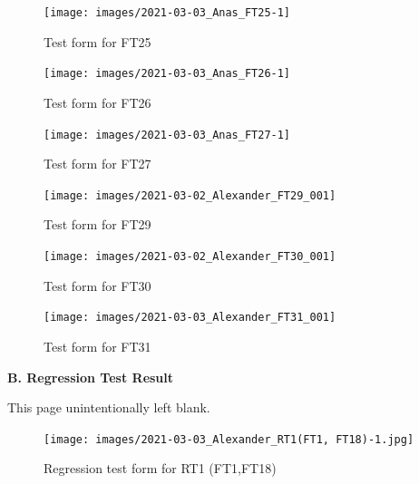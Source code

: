 \documentclass{article}
\begin{document}
 \begin{figure}
     \centering
     \texttt{[image: images/2021-03-03\_Anas\_FT25-1]}
     \renewcommand\figurename{Figure}
     \caption{Test form for FT25}
     \label{fig:my_label}
 \end{figure}
 
 \begin{figure}
     \centering
     \texttt{[image: images/2021-03-03\_Anas\_FT26-1]}
     \renewcommand\figurename{Figure}
     \caption{Test form for FT26}
     \label{fig:my_label}
 \end{figure}
 
 \begin{figure}
     \centering
     \texttt{[image: images/2021-03-03\_Anas\_FT27-1]}
     \renewcommand\figurename{Figure}
     \caption{Test form for FT27}
     \label{fig:my_label}
 \end{figure}
 
 \begin{figure}
     \centering
     \texttt{[image: images/2021-03-02\_Alexander\_FT29\_001]}
     \renewcommand\figurename{Figure}
     \caption{Test form for FT29}
     \label{fig:my_label}
 \end{figure}
 
 \begin{figure}
     \centering
     \texttt{[image: images/2021-03-02\_Alexander\_FT30\_001]}
     \renewcommand\figurename{Figure}
     \caption{Test form for FT30}
     \label{fig:my_label}
 \end{figure}
 
 \begin{figure}
     \centering
     \texttt{[image: images/2021-03-03\_Alexander\_FT31\_001]}
     \renewcommand\figurename{Figure}
     \caption{Test form for FT31}
     \label{fig:my_label}
 \end{figure}


\newpage
\begin{flushleft}
{\large \textbf{B. Regression Test Result}}
\end{flushleft}

\vspace*{\fill}
                \hfill
                \begin{center}
                This page unintentionally left blank.
                \end{center}
                \vspace{\fill}
                \thispagestyle{empty}

 \begin{figure}
     \centering
     \texttt{[image: images/2021-03-03\_Alexander\_RT1(FT1, FT18)-1.jpg]}
     \renewcommand\figurename{Figure}
     \caption{Regression test form for RT1 (FT1,FT18)}
     \label{fig:my_label}
 \end{figure}
 
\end{document}
